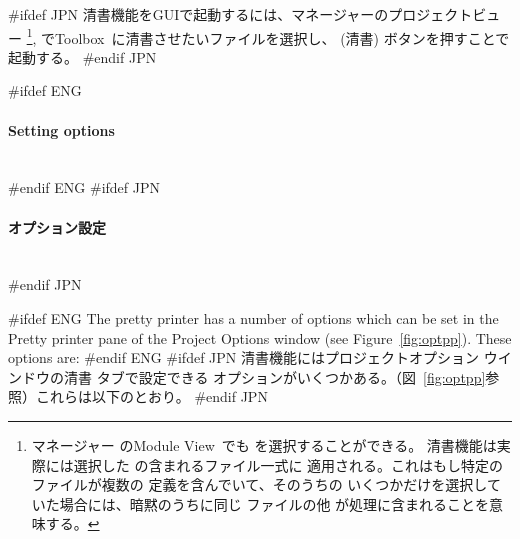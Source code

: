 \documentclass[\pformat,12pt]{article}
\newcommand{\Toolbox}{Toolbox}
\newcommand{\vdmModView}{\guicmd{Module View}}
\newcommand{\vdmModView}{\guicmd{モジュールビュー}}
\newcommand{\Toolbox}{Toolbox}
\newcommand{\vdmModView}{\guicmd{VDM View}}
\newcommand{\vdmModView}{\guicmd{VDMビュー}}
\newcommand{\subsubsubsection}[1]{\paragraph{#1}\mbox{}\\}
\newcommand{\guicmd}[1]{{\sf #1}}
\newcommand{\guicmd}[1]{{\gt #1}}
\begin{document}
#ifdef JPN
清書機能をGUIで起動するには、\guicmd{マネージャー}の\guicmd{プロジェクトビュー} %
\footnote{%
  \guicmd{マネージャー} の\vdmModView\ でも
  を選択することができる。
  清書機能は実際には選択した
  の含まれるファイル一式に
  適用される。これはもし特定のファイルが複数の
   定義を含んでいて、そのうちの
  いくつかだけを選択していた場合には、暗黙のうちに同じ
  ファイルの他  が処理に含まれることを意味する。
},%
で\Toolbox\ に清書させたいファイルを選択し、 
(\guicmd{清書}) ボタンを押すことで起動する。
#endif JPN

#ifdef ENG
\subsubsubsection{Setting options}
#endif ENG
#ifdef JPN
\subsubsubsection{オプション設定}
#endif JPN

#ifdef ENG
The pretty printer has a number of options which can be set in the 
\guicmd{Pretty printer} pane of the \guicmd{Project Options} window (see
Figure~\ref{fig:optpp}). These options are:
#endif ENG
#ifdef JPN
清書機能には\guicmd{プロジェクトオプション} ウインドウの\guicmd{清書} タブで設定できる
オプションがいくつかある。（図~\ref{fig:optpp}参照）これらは以下のとおり。
#endif JPN
\end{document}
